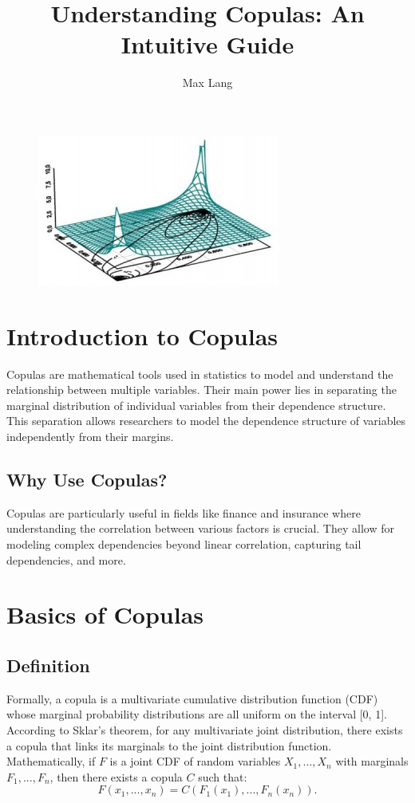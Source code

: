 \documentclass{article}
\title{Understanding Copulas: An Intuitive Guide}
\author{Max Lang}
\date{}
\begin{document}
\maketitle
\begin{figure}
    \centering
    \includegraphics[width=0.75\linewidth]{overviews//copulas//figures/copula.jpg}

\end{figure}
\section{Introduction to Copulas}
Copulas are mathematical tools used in statistics to model and understand the relationship between multiple variables. Their main power lies in separating the marginal distribution of individual variables from their dependence structure. This separation allows researchers to model the dependence structure of variables independently from their margins.

\subsection{Why Use Copulas?}
Copulas are particularly useful in fields like finance and insurance where understanding the correlation between various factors is crucial. They allow for modeling complex dependencies beyond linear correlation, capturing tail dependencies, and more.

\section{Basics of Copulas}
\subsection{Definition}
Formally, a copula is a multivariate cumulative distribution function (CDF) whose marginal probability distributions are all uniform on the interval [0, 1]. According to Sklar's theorem, for any multivariate joint distribution, there exists a copula that links its marginals to the joint distribution function. Mathematically, if $F$ is a joint CDF of random variables $X_1, ..., X_n$ with marginals $F_1, ..., F_n$, then there exists a copula $C$ such that:
$$
F(x_1, ..., x_n) = C(F_1(x_1), ..., F_n(x_n)).
$$
\end{document}
